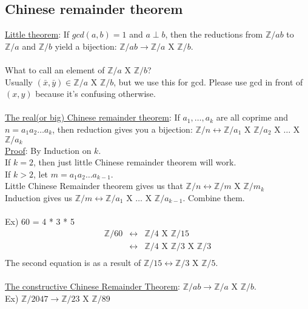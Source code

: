 \documentclass[13pt]{article}
\begin{document}
	\subsection*{Chinese remainder theorem}
		\underline{Little theorem}: If $gcd(a,b) = 1$ and $a \perp b$, then
		the reductions from $\mathbb{Z}/ab$ to $\mathbb{Z}/a$ and $\mathbb{Z}/b$
		yield a bijection: $\mathbb{Z}/ab \rightarrow \mathbb{Z}/a$ X
		$\mathbb{Z}/b$.\\\\
		What to call an element of $\mathbb{Z}/a$ X $\mathbb{Z}/b$?\\
		Usually $(\bar{x}, \bar{y}) \in \mathbb{Z}/a$ X $\mathbb{Z}/b$, but
		we use this for gcd. Please use gcd in front of $(x,y)$ because it's
		confusing otherwise.\\\\
		\underline{The real(or big) Chinese remainder theorem}: If $a_1, \ldots,
		a_k$ are all coprime and $n = a_1a_2\ldots a_k$, then reduction gives
		you a bijection: $\mathbb{Z}/n \leftrightarrow \mathbb{Z}/a_1$ X 
		$\mathbb{Z}/a_2$ X $\ldots$ X $\mathbb{Z}/a_k$\\
		\underline{Proof}: By Induction on $k$.\\
		If $k = 2$, then just little Chinese remainder theorem will work.\\
		If $k > 2$, let $m = a_1a_2\ldots a_{k - 1}.$\\
		Little Chinese Remainder theorem gives us that $\mathbb{Z}/n 
		\leftrightarrow \mathbb{Z}/m$ X $\mathbb{Z}/m_k$\\
		Induction gives us $\mathbb{Z}/m \leftrightarrow \mathbb{Z}/a_1$ X 
		$\ldots$ X $\mathbb{Z}/a_{k-1}$. Combine them.\\\\
		Ex) 60 = 4 * 3 * 5\\
		\begin{eqnarray*}
		\mathbb{Z}/60 &\leftrightarrow& \mathbb{Z}/4 \text{ X } \mathbb{Z}/15\\
		&\leftrightarrow& \mathbb{Z}/4 \text{ X } \mathbb{Z}/3 \text{ X } 
		 \mathbb{Z}/3\\
		\end{eqnarray*}
		The second equation is as a result of $\mathbb{Z}/15 \leftrightarrow
		\mathbb{Z}/3$ X $\mathbb{Z}/5$.\\\\
		\underline{The constructive Chinese Remainder Theorem}: 
		$\mathbb{Z}/ab \rightarrow \mathbb{Z}/a$ X $\mathbb{Z}/b$.\\
		Ex) $\mathbb{Z}/2047 \rightarrow \mathbb{Z}/23$ X $\mathbb{Z}/89$\\
\end{document}
